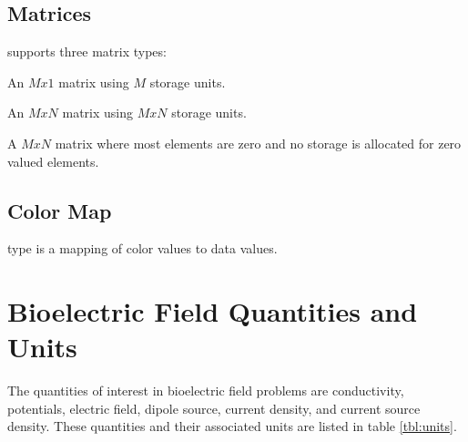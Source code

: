 




\subsection{Matrices}

\sr{} supports three matrix types: 

\begin{description}
 An \(Mx1\) matrix using \(M\)
storage units.

 An \(MxN\) matrix using \(MxN\)
storage units.

 A \(MxN\) matrix where most
elements are zero and no storage is allocated for zero valued
elements.
\end{description}

\subsection{Color Map}

\sr{}  type is a mapping of color values to data values.

\section{Bioelectric Field Quantities and Units}
\label{sec:units}

The quantities of interest in bioelectric field problems are
conductivity, potentials, electric field, dipole source, current
density, and current source density. These quantities and their
associated units are listed in table \ref{tbl:units}.

